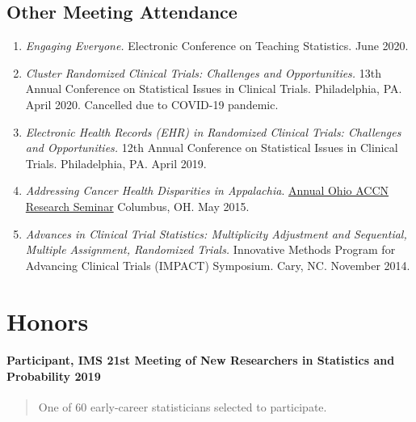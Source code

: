 \documentclass[
  fleqn, oneside]{article}
\begin{document}
\hypertarget{other-meeting-attendance}{%
\subsection{Other Meeting Attendance}\label{other-meeting-attendance}}

\begin{enumerate}
\def\labelenumi{\arabic{enumi}.}
\item
  \emph{Engaging Everyone.} Electronic Conference on Teaching
  Statistics. June 2020.
\item
  \emph{Cluster Randomized Clinical Trials: Challenges and
  Opportunities.} 13th Annual Conference on Statistical Issues in
  Clinical Trials. Philadelphia, PA. April 2020. Cancelled due to
  COVID-19 pandemic.
\item
  \emph{Electronic Health Records (EHR) in Randomized Clinical Trials:
  Challenges and Opportunities.} 12th Annual Conference on Statistical
  Issues in Clinical Trials. Philadelphia, PA. April 2019.
\item
  \emph{Addressing Cancer Health Disparities in Appalachia}.
  \href{http//fcs.osu.edu/2015-annual-ohio-accn-research-seminar}{Annual
  Ohio ACCN Research Seminar} Columbus, OH. May 2015.
\item
  \emph{Advances in Clinical Trial Statistics: Multiplicity Adjustment
  and Sequential, Multiple Assignment, Randomized Trials.} Innovative
  Methods Program for Advancing Clinical Trials (IMPACT) Symposium.
  Cary, NC. November 2014.
\end{enumerate}

\hypertarget{honors}{%
\section{Honors}\label{honors}}

\hypertarget{participant-ims-21st-meeting-of-new-researchers-in-statistics-and-probability-2019}{%
\paragraph{\texorpdfstring{Participant, IMS 21st Meeting of New
Researchers in Statistics and Probability
\hfill 2019}{Participant, IMS 21st Meeting of New Researchers in Statistics and Probability 2019}}\label{participant-ims-21st-meeting-of-new-researchers-in-statistics-and-probability-2019}}

\begin{quote}
One of 60 early-career statisticians selected to participate.
\end{quote}
\end{document}
